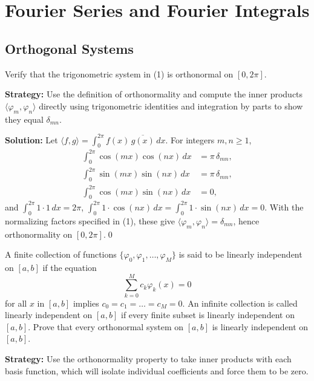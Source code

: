 \chapter{Fourier Series and Fourier Integrals}

\section{Orthogonal Systems}



\begin{problembox}
Verify that the trigonometric system in (1) is orthonormal on $[0, 2\pi]$.
\end{problembox}

\noindent\textbf{Strategy:} Use the definition of orthonormality and compute the inner products $\langle \varphi_m, \varphi_n \rangle$ directly using trigonometric identities and integration by parts to show they equal $\delta_{mn}$.

\bigskip\noindent\textbf{Solution:}
Let $\langle f, g\rangle = \int_0^{2\pi} f(x)\,\overline{g(x)}\,dx$. For integers $m, n \ge 1$,
\begin{align*}
\int_0^{2\pi} \cos(mx)\cos(nx)\,dx &= \pi\,\delta_{mn},\\
\int_0^{2\pi} \sin(mx)\sin(nx)\,dx &= \pi\,\delta_{mn},\\
\int_0^{2\pi} \cos(mx)\sin(nx)\,dx &= 0,
\end{align*}
and $\int_0^{2\pi} 1\cdot 1\,dx = 2\pi$, $\int_0^{2\pi} 1\cdot \cos(nx)\,dx = \int_0^{2\pi} 1\cdot \sin(nx)\,dx = 0$. With the normalizing factors specified in (1), these give $\langle \varphi_m, \varphi_n\rangle = \delta_{mn}$, hence orthonormality on $[0,2\pi]$.\qed


\begin{problembox}
A finite collection of functions $\{\varphi_0, \varphi_1, \dots, \varphi_M\}$ is said to be linearly independent on $[a, b]$ if the equation
\[
\sum_{k=0}^M c_k \varphi_k(x) = 0
\]
for all $x$ in $[a, b]$ implies $c_0 = c_1 = \dots = c_M = 0$. An infinite collection is called linearly independent on $[a, b]$ if every finite subset is linearly independent on $[a, b]$. Prove that every orthonormal system on $[a, b]$ is linearly independent on $[a, b]$.
\end{problembox}

\noindent\textbf{Strategy:} Use the orthonormality property to take inner products with each basis function, which will isolate individual coefficients and force them to be zero.

